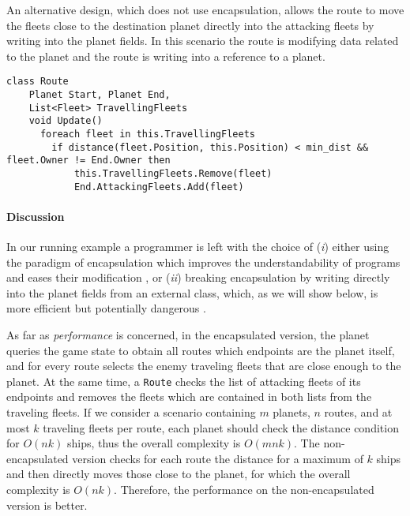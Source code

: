 An alternative design, which does not use encapsulation, allows the route to move the fleets close to the destination planet directly into the attacking fleets by writing into the planet fields. In this scenario the route is modifying data related to the planet and the route is writing into a reference to a planet.
\begin{lstlisting}
class Route
    Planet Start, Planet End,
    List<Fleet> TravellingFleets
    void Update()
      foreach fleet in this.TravellingFleets
        if distance(fleet.Position, this.Position) < min_dist && fleet.Owner != End.Owner then
            this.TravellingFleets.Remove(fleet)
            End.AttackingFleets.Add(fleet)
\end{lstlisting}
\paragraph*{Discussion}
In our running example a programmer is left with the choice of (\textit{i}) either using the paradigm of encapsulation which improves the understandability of programs and eases their modification \cite{ENCAPSULATION_AND_INHERITANCE_IN_OOP}, or (\textit{ii}) breaking encapsulation by writing directly into the planet fields from an external class, which, as we will show below, is more efficient but potentially dangerous \cite{eder1994coupling}.

As far as \emph{performance} is concerned, in the encapsulated version, the planet queries the game state to obtain all routes which endpoints are the planet itself, and for every route selects the enemy traveling fleets that are close enough to the planet. At the same time, a \texttt{Route} checks the list of attacking fleets of its endpoints and removes the fleets which are contained in both lists from the traveling fleets. If we consider a scenario containing $m$ planets, $n$ routes, and at most $k$ traveling fleets per route, each planet should check the distance condition for $O(nk)$ ships, thus the overall complexity is $O(mnk)$. The non-encapsulated version checks for each route the distance for a maximum of $k$ ships and then directly moves those close to the planet, for which the overall complexity is $O(nk)$. Therefore, the performance on the non-encapsulated version is better.

